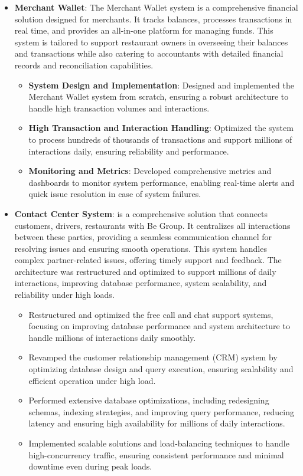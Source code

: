 \documentclass[letterpaper,11pt]{article}
\newcommand{\resumeItem}[2]{
  \item\small{
    \textbf{#1}{: #2 \vspace{-2pt}}
  }
}
\newcommand{\resumeItemListStart}{\begin{itemize}}
\newcommand{\resumeItemListEnd}{\end{itemize}\vspace{-5pt}}
\begin{document}
    \resumeItemListStart
      \resumeItem{ Merchant Wallet}
      {The Merchant Wallet system is a comprehensive financial solution designed for merchants. It tracks balances, processes transactions in real time, and provides an all-in-one platform for managing funds. This system is tailored to support restaurant owners in overseeing their balances and transactions while also catering to accountants with detailed financial records and reconciliation capabilities.}
      \resumeItemListStart
        \resumeItem{System Design and Implementation}
        {Designed and implemented the Merchant Wallet system from scratch, ensuring a robust architecture to handle high transaction volumes and interactions.}
        \resumeItem{High Transaction and Interaction Handling}
        {Optimized the system to process hundreds of thousands of transactions and support millions of interactions daily, ensuring reliability and performance.}
        \resumeItem{Monitoring and Metrics}
        {Developed comprehensive metrics and dashboards to monitor system performance, enabling real-time alerts and quick issue resolution in case of system failures.}
      \resumeItemListEnd
    \resumeItemListEnd

    \resumeItemListStart
      \resumeItem{Contact Center System}
        {is a comprehensive solution that connects customers, drivers, restaurants with Be Group. It centralizes all interactions between these parties, providing a seamless communication channel for resolving issues and ensuring smooth operations. This system handles complex partner-related issues, offering timely support and feedback. The architecture was restructured and optimized to support millions of daily interactions, improving database performance, system scalability, and reliability under high loads.}
        \begin{itemize}
          \item Restructured and optimized the free call and chat support systems, focusing on improving database performance and system architecture to handle millions of interactions daily smoothly.
          \item Revamped the customer relationship management (CRM) system by optimizing database design and query execution, ensuring scalability and efficient operation under high load.
          \item Performed extensive database optimizations, including redesigning schemas, indexing strategies, and improving query performance, reducing latency and ensuring high availability for millions of daily interactions.
          \item Implemented scalable solutions and load-balancing techniques to handle high-concurrency traffic, ensuring consistent performance and minimal downtime even during peak loads.
        \end{itemize}
    \resumeItemListEnd
\end{document}

